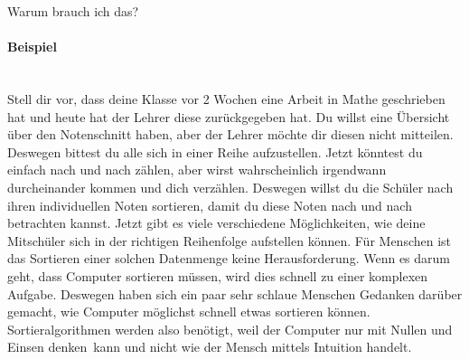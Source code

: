 \documentclass[a4paper, 12pt]{report}
\begin{document}
	\thispagestyle{empty}
	
	{
		\centering
		\Huge
		\color{blue}
		Warum brauch ich das?
	}
	
	\raggedright
	\paragraph{\color{blue}Beispiel} \mbox{} \\
	
	Stell dir vor, dass deine Klasse vor 2 Wochen eine Arbeit in Mathe geschrieben hat
	und heute hat der Lehrer diese zurückgegeben hat.
	Du willst eine Übersicht über den Notenschnitt haben, aber der Lehrer möchte dir diesen nicht mitteilen.
	Deswegen bittest du alle sich in einer Reihe aufzustellen.
	Jetzt könntest du einfach nach und nach zählen, aber wirst wahrscheinlich irgendwann durcheinander kommen und dich verzählen.
	Deswegen willst du die Schüler nach ihren individuellen Noten sortieren, damit du diese Noten nach und nach betrachten kannst.
	Jetzt gibt es viele verschiedene Möglichkeiten, wie deine Mitschüler sich in der richtigen Reihenfolge aufstellen können.
	Für Menschen ist das Sortieren einer solchen Datenmenge keine Herausforderung.
	Wenn es darum geht, dass Computer sortieren müssen, wird dies schnell zu einer komplexen Aufgabe.
	Deswegen haben sich ein paar sehr schlaue Menschen Gedanken darüber gemacht, wie Computer möglichst schnell etwas sortieren können.
	\\
	Sortieralgorithmen werden also benötigt, weil
	 der Computer nur mit Nullen und Einsen \dq denken\dq\ kann und nicht wie der Mensch mittels Intuition handelt.
\end{document}
